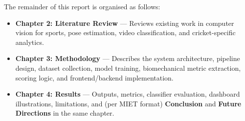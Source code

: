 \begin{justify}
\par The remainder of this report is organised as follows:

\begin{itemize}
    \item \textbf{Chapter 2: Literature Review} --- Reviews existing work in computer vision for sports, pose estimation, video classification, and cricket-specific analytics.
    \item \textbf{Chapter 3: Methodology} --- Describes the system architecture, pipeline design, dataset collection, model training, biomechanical metric extraction, scoring logic, and frontend/backend implementation.
    \item \textbf{Chapter 4: Results} --- Outputs, metrics, classifier evaluation, dashboard illustrations, limitations, and (per MIET format) \textbf{Conclusion} and \textbf{Future Directions} in the same chapter.
\end{itemize}

\end{justify}

